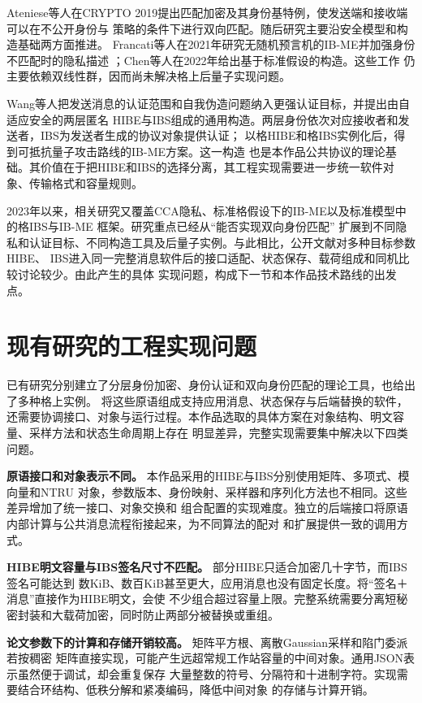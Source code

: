 Ateniese等人在CRYPTO 2019提出匹配加密及其身份基特例，使发送端和接收端可以在不公开身份与
策略的条件下进行双向匹配\cite{ateniese2019me}。随后研究主要沿安全模型和构造基础两方面推进。
Francati等人在2021年研究无随机预言机的IB-ME并加强身份不匹配时的隐私描述
\cite{francati2021ibme}；Chen等人在2022年给出基于标准假设的构造\cite{chen2022ibme}。这些工作
仍主要依赖双线性群，因而尚未解决格上后量子实现问题。

Wang等人把发送消息的认证范围和自我伪造问题纳入更强认证目标，并提出由自适应安全的两层匿名
HIBE与IBS组成的通用构造。两层身份依次对应接收者和发送者，IBS为发送者生成的协议对象提供认证；
以格HIBE和格IBS实例化后，得到可抵抗量子攻击路线的IB-ME方案\cite{wang2024ibme}。这一构造
也是本作品公共协议的理论基础。其价值在于把HIBE和IBS的选择分离，其工程实现需要进一步统一软件对象、传输格式和容量规则。

2023年以来，相关研究又覆盖CCA隐私、标准格假设下的IB-ME以及标准模型中的格IBS与IB-ME
框架\cite{chiku2023ibme,belfiore2024ibme,yu2026ibme}。研究重点已经从“能否实现双向身份匹配”
扩展到不同隐私和认证目标、不同构造工具及后量子实例。与此相比，公开文献对多种目标参数HIBE、
IBS进入同一完整消息软件后的接口适配、状态保存、载荷组成和同机比较讨论较少。由此产生的具体
实现问题，构成下一节和本作品技术路线的出发点。

\section{现有研究的工程实现问题}

已有研究分别建立了分层身份加密、身份认证和双向身份匹配的理论工具，也给出了多种格上实例。
将这些原语组成支持应用消息、状态保存与后端替换的软件，还需要协调接口、对象与运行过程。本作品选取的具体方案在对象结构、明文容量、采样方法和状态生命周期上存在
明显差异，完整实现需要集中解决以下四类问题。

\textbf{原语接口和对象表示不同。} 本作品采用的HIBE与IBS分别使用矩阵、多项式、模向量和NTRU
对象，参数版本、身份映射、采样器和序列化方法也不相同。这些差异增加了统一接口、对象交换和
组合配置的实现难度。独立的后端接口将原语内部计算与公共消息流程衔接起来，为不同算法的配对
和扩展提供一致的调用方式。

\textbf{HIBE明文容量与IBS签名尺寸不匹配。} 部分HIBE只适合加密几十字节，而IBS签名可能达到
数KiB、数百KiB甚至更大，应用消息也没有固定长度。将“签名＋消息”直接作为HIBE明文，会使
不少组合超过容量上限。完整系统需要分离短秘密封装和大载荷加密，同时防止两部分被替换或重组。

\textbf{论文参数下的计算和存储开销较高。} 矩阵平方根、离散Gaussian采样和陷门委派若按稠密
矩阵直接实现，可能产生远超常规工作站容量的中间对象。通用JSON表示虽然便于调试，却会重复保存
大量整数的符号、分隔符和十进制字符。实现需要结合环结构、低秩分解和紧凑编码，降低中间对象
的存储与计算开销。

